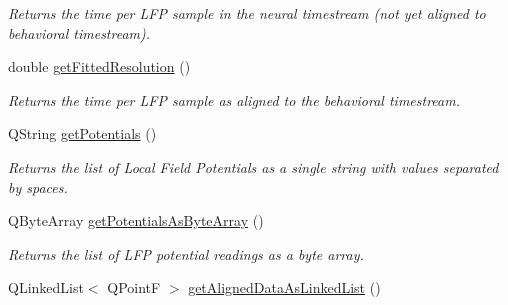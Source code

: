 \begin{DoxyCompactItemize}
\begin{DoxyCompactList}\small\item\em Returns the time per L\-F\-P sample in the neural timestream (not yet aligned to behavioral timestream). \end{DoxyCompactList}\item 
\hypertarget{class_picto_1_1_l_f_p_data_unit_package_a6fa5ad6ff8889c6e51d0dfd458db72da}{double \hyperlink{class_picto_1_1_l_f_p_data_unit_package_a6fa5ad6ff8889c6e51d0dfd458db72da}{get\-Fitted\-Resolution} ()}\label{class_picto_1_1_l_f_p_data_unit_package_a6fa5ad6ff8889c6e51d0dfd458db72da}

\begin{DoxyCompactList}\small\item\em Returns the time per L\-F\-P sample as aligned to the behavioral timestream. \end{DoxyCompactList}\item 
\hypertarget{class_picto_1_1_l_f_p_data_unit_package_aa0ea684e758811dc76d26101d46262c8}{Q\-String \hyperlink{class_picto_1_1_l_f_p_data_unit_package_aa0ea684e758811dc76d26101d46262c8}{get\-Potentials} ()}\label{class_picto_1_1_l_f_p_data_unit_package_aa0ea684e758811dc76d26101d46262c8}

\begin{DoxyCompactList}\small\item\em Returns the list of Local Field Potentials as a single string with values separated by spaces. \end{DoxyCompactList}\item 
\hypertarget{class_picto_1_1_l_f_p_data_unit_package_a65b72eec9a8d87fdf401e6955170d17c}{Q\-Byte\-Array \hyperlink{class_picto_1_1_l_f_p_data_unit_package_a65b72eec9a8d87fdf401e6955170d17c}{get\-Potentials\-As\-Byte\-Array} ()}\label{class_picto_1_1_l_f_p_data_unit_package_a65b72eec9a8d87fdf401e6955170d17c}

\begin{DoxyCompactList}\small\item\em Returns the list of L\-F\-P potential readings as a byte array. \end{DoxyCompactList}\item 
\hypertarget{class_picto_1_1_l_f_p_data_unit_package_a5e91b0d3d6b8cf42c456cb5e88a489a7}{Q\-Linked\-List$<$ Q\-Point\-F $>$ \hyperlink{class_picto_1_1_l_f_p_data_unit_package_a5e91b0d3d6b8cf42c456cb5e88a489a7}{get\-Aligned\-Data\-As\-Linked\-List} ()}\label{class_picto_1_1_l_f_p_data_unit_package_a5e91b0d3d6b8cf42c456cb5e88a489a7}


\end{DoxyCompactItemize}
